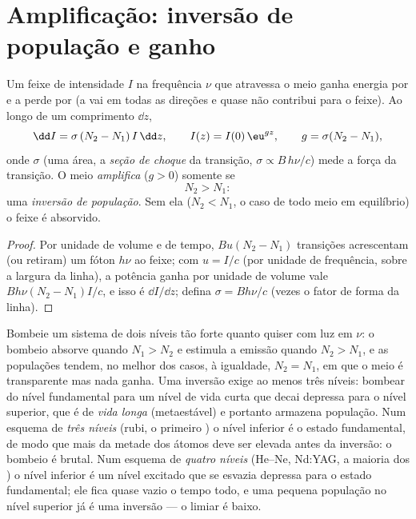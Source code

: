 \section{Amplificação: inversão de população e ganho}

\begin{proposition}\label{prop:b2:laser:gain}
Um feixe de intensidade $I$ na frequência $\nu$ que atravessa o meio
ganha energia por  e a perde por 
(a  vai em todas as direções e quase não contribui para
o feixe). Ao longo de um comprimento $\dd z$,
\[
\dd I = \sigma\,(N_2 - N_1)\,I\,\dd z, \qquad
I(z) = I(0)\,\eu^{g z}, \qquad g = \sigma(N_2 - N_1),
\]
onde $\sigma$ (uma área, a \emph{seção de choque} da transição, $\sigma \propto B\,h\nu/c$) mede
a força da transição. O meio \emph{amplifica} ($g > 0$)
somente se
\[
N_2 > N_1 :
\]
uma \emph{inversão de população}. Sem ela
($N_2 < N_1$, o caso de todo meio em equilíbrio) o feixe é
absorvido.
\end{proposition}

\begin{proof}
Por unidade de volume e de tempo, $B u (N_2 - N_1)$ transições acrescentam (ou retiram)
um fóton $h\nu$ ao feixe; com $u = I/c$ (por unidade de frequência, sobre
a largura da linha), a potência ganha por unidade de volume vale
$B h\nu (N_2 - N_1) I/c$, e isso é $\dd I/\dd z$; defina $\sigma =
Bh\nu/c$ (vezes o fator de forma da linha).
\end{proof}

\begin{remark}\label{rem:b2:laser:twolevel}
Bombeie um sistema de dois níveis tão forte quanto quiser com luz em $\nu$: o
bombeio absorve quando $N_1 > N_2$ e estimula a emissão quando $N_2 > N_1$,
e as populações tendem, no melhor dos casos, à igualdade, $N_2 = N_1$, em que o
meio é transparente mas nada ganha. Uma inversão exige ao menos
três níveis: bombear do nível fundamental para um nível de vida curta que
decai depressa para o nível  superior, que é de \emph{vida longa}
(metaestável) e portanto armazena população. Num esquema de
\emph{três níveis} (rubi, o primeiro
) o nível  inferior é o estado fundamental, de modo que mais da metade
dos átomos deve ser elevada antes da inversão: o bombeio é brutal. Num esquema de
\emph{quatro níveis} (He--Ne, Nd:YAG, a maioria
dos ) o nível  inferior é um nível excitado que se esvazia depressa
para o estado fundamental; ele fica quase vazio o tempo todo, e uma pequena
população no nível superior já é uma inversão --- o limiar
é baixo.
\end{remark}

